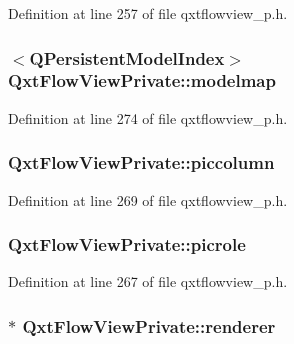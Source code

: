 Definition at line 257 of file qxtflowview\-\_\-p.\-h.

\hypertarget{class_qxt_flow_view_private_a747c83c6a43f0c724a3537f10496caf0}{
\subsubsection[{modelmap}]{$<$Q\-Persistent\-Model\-Index$>$ Qxt\-Flow\-View\-Private\-::modelmap}}\label{class_qxt_flow_view_private_a747c83c6a43f0c724a3537f10496caf0}


Definition at line 274 of file qxtflowview\-\_\-p.\-h.

\hypertarget{class_qxt_flow_view_private_a9ab798b08582230e8d456fc65c6f00e6}{
\subsubsection[{piccolumn}]{ Qxt\-Flow\-View\-Private\-::piccolumn}}\label{class_qxt_flow_view_private_a9ab798b08582230e8d456fc65c6f00e6}


Definition at line 269 of file qxtflowview\-\_\-p.\-h.

\hypertarget{class_qxt_flow_view_private_a9d7a7654e4f1f24aaca5c9ab0587e795}{
\subsubsection[{picrole}]{ Qxt\-Flow\-View\-Private\-::picrole}}\label{class_qxt_flow_view_private_a9d7a7654e4f1f24aaca5c9ab0587e795}


Definition at line 267 of file qxtflowview\-\_\-p.\-h.

\hypertarget{class_qxt_flow_view_private_ad3a1c99bc649eb596cd4d1a5749a8091}{
\subsubsection[{renderer}]{$\ast$ Qxt\-Flow\-View\-Private\-::renderer}}\label{class_qxt_flow_view_private_ad3a1c99bc649eb596cd4d1a5749a8091}


